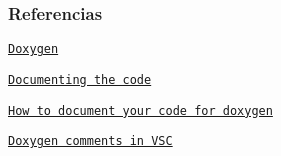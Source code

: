 \subsubsection*{Referencias}


\begin{DoxyItemize}
\item \href{https://www.doxygen.nl/index.html}{\tt Doxygen}
\item \href{https://www.doxygen.nl/manual/docblocks.html#specialblock}{\tt Documenting the code}
\item \href{https://www-numi.fnal.gov/offline_software/srt_public_context/WebDocs/doxygen-howto.html}{\tt How to document your code for doxygen}
\item \href{https://devblogs.microsoft.com/cppblog/visual-studio-code-c-extension-july-2020-update-doxygen-comments-and-logpoints/}{\tt Doxygen comments in V\+SC} 
\end{DoxyItemize}